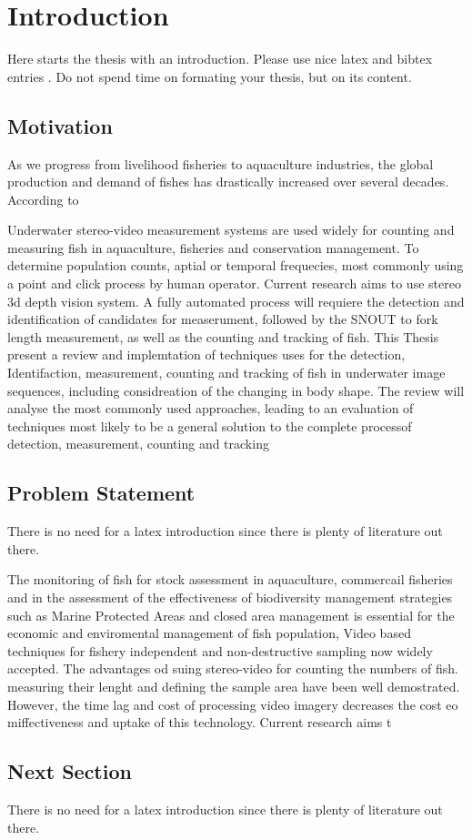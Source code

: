 \chapter{Introduction}
\label{chapter:Introduction}



Here starts the thesis with an introduction. Please use nice latex and bibtex entries \cite{latex}. Do not spend time on formating your thesis, but on its content. 
 
\section{Motivation}
As we progress from livelihood fisheries to aquaculture industries, the global production and demand of fishes has drastically increased over several decades. According to 

Underwater stereo-video measurement systems are used widely for counting
and measuring fish in aquaculture, fisheries and conservation management.
To determine population counts, aptial or temporal frequecies, most commonly using a point and click process by human operator.
Current research aims to use stereo 3d depth vision system. 
A fully automated process will requiere the detection and identification
of candidates for measerument, followed by the SNOUT to fork length measurement, as well as the counting and tracking of fish. This Thesis present a review and implemtation of techniques uses for the detection, Identifaction, measurement, counting and tracking of fish in underwater image sequences, including considreation of the changing in body shape.
The review will analyse the most commonly used approaches, leading to an evaluation of techniques most likely to be a  general solution to the complete processof detection, measurement, counting and tracking


\section{Problem Statement}
There is no need for a latex introduction since there is plenty of literature out there.

The monitoring of fish for stock assessment in aquaculture,
commercail fisheries and in the assessment of the effectiveness of biodiversity management strategies such as Marine Protected Areas and closed area management is essential for the economic and enviromental management of fish population,
Video based techniques for fishery independent and non-destructive sampling now widely accepted.
The advantages od suing stereo-video for counting the numbers of fish. measuring their lenght and defining the sample area have been well demostrated.
However, the time lag and cost of processing video imagery decreases the cost eo miffectiveness and uptake of this technology. Current research aims t



\section{Next Section}
There is no need for a latex introduction since there is plenty of literature out there.
